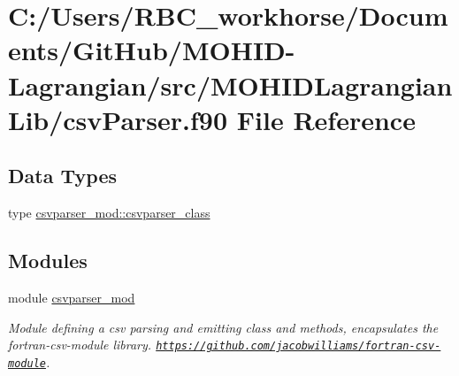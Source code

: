 \hypertarget{csv_parser_8f90}{}\section{C\+:/\+Users/\+R\+B\+C\+\_\+workhorse/\+Documents/\+Git\+Hub/\+M\+O\+H\+I\+D-\/\+Lagrangian/src/\+M\+O\+H\+I\+D\+Lagrangian\+Lib/csv\+Parser.f90 File Reference}
\label{csv_parser_8f90}
\subsection*{Data Types}
\begin{DoxyCompactItemize}
\item 
type \mbox{\hyperlink{structcsvparser__mod_1_1csvparser__class}{csvparser\+\_\+mod\+::csvparser\+\_\+class}}
\end{DoxyCompactItemize}
\subsection*{Modules}
\begin{DoxyCompactItemize}
\item 
module \mbox{\hyperlink{namespacecsvparser__mod}{csvparser\+\_\+mod}}
\begin{DoxyCompactList}\small\item\em Module defining a csv parsing and emitting class and methods, encapsulates the fortran-\/csv-\/module library. \href{https://github.com/jacobwilliams/fortran-csv-module}{\tt https\+://github.\+com/jacobwilliams/fortran-\/csv-\/module}. \end{DoxyCompactList}\end{DoxyCompactItemize}
